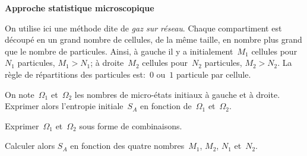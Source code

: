 \documentclass[utf8, 11pt]{feuille}
\begin{document}
\medskip

{\sffamily\bfseries{Approche statistique microscopique}}

On utilise ici une méthode dite de {\em gaz sur réseau}.
Chaque compartiment est découpé en un grand nombre de cellules, de la
même taille, en nombre
plus grand que le nombre de particules.
Ainsi, à gauche il y a initialement~$M_1$ cellules pour~$N_1$
particules, $M_1>N_1$; à droite~$M_2$ cellules pour~$N_2$ particules, $M_2>N_2$.
La règle de répartitions des particules est:~$0$ ou~$1$ particule par cellule.

\medskip


\medskip

\question
On note~$\Omega_1$ et~$\Omega_2$ les nombres de micro-états initiaux à
gauche et à droite. Exprimer alors l'entropie initiale~$S_A$ en
fonction de~$\Omega_1$ et~$\Omega_2$.

\question
Exprimer~$\Omega_1$ et~$\Omega_2$ sous forme de combinaisons.

\question
Calculer alors $S_A$ en fonction des quatre nombres~$M_1$, $M_2$,
$N_1$ et~$N_2$.
\end{document}
